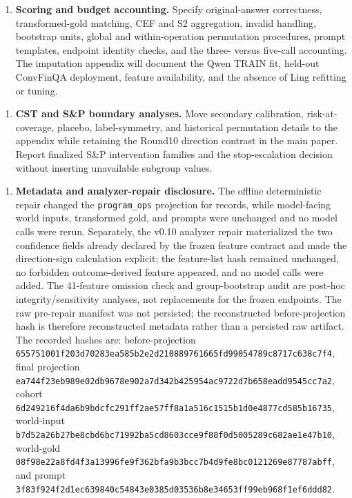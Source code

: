 \documentclass[11pt]{article}
\begin{document}
\begin{enumerate}
  \item \textbf{Scoring and budget accounting.} Specify original-answer correctness, transformed-gold matching, CEF and S2 aggregation, invalid handling, bootstrap units, global and within-operation permutation procedures, prompt templates, endpoint identity checks, and the three- versus five-call accounting. The imputation appendix will document the Qwen TRAIN fit, held-out ConvFinQA deployment, feature availability, and the absence of Ling refitting or tuning.
\end{enumerate}

\begin{enumerate}
  \item \textbf{CST and S\&P boundary analyses.} Move secondary calibration, risk-at-coverage, placebo, label-symmetry, and historical permutation details to the appendix while retaining the Round10 direction contrast in the main paper. Report finalized S\&P intervention families and the stop-escalation decision without inserting unavailable subgroup values.
\end{enumerate}

\begin{enumerate}
  \item \textbf{Metadata and analyzer-repair disclosure.} The offline deterministic repair changed the \texttt{program\_ops} projection for  records, while model-facing world inputs, transformed gold, and prompts were unchanged and no model calls were rerun. Separately, the v0.10 analyzer repair materialized the two confidence fields already declared by the frozen feature contract and made the direction-sign calculation explicit; the feature-list hash remained unchanged, no forbidden outcome-derived feature appeared, and no model calls were added. The 41-feature omission check and group-bootstrap audit are post-hoc integrity/sensitivity analyses, not replacements for the frozen endpoints. The raw pre-repair manifest was not persisted; the reconstructed before-projection hash is therefore reconstructed metadata rather than a persisted raw artifact. The recorded hashes are: before-projection \texttt{655751001f203d70283ea585b2e2d210889761665fd99054789c8717c638c7f4}, final projection \texttt{ea744f23eb989e02db9678e902a7d342b425954ac9722d7b658eadd9545cc7a2}, cohort \texttt{6d249216f4da6b9bdcfc291ff2ae57ff8a1a516c1515b1d0e4877cd585b16735}, world-input \texttt{b7d52a26b27be8cbd6bc71992ba5cd8603cce9f88f0d5005289c682ae1e47b10}, world-gold \texttt{08f98e22a8fd4f3a13996fe9f362bfa9b3bcc7b4d9fe8bc0121269e87787abff}, and prompt \texttt{3f83f924f2d1ec639840c54843e0385d03536b8e34653ff99eb968f1ef6ddd82}.
\end{enumerate}
\end{document}
